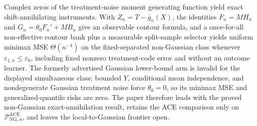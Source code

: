 Complex zeros of the treatment-noise moment generating function yield exact shift-annihilating instruments. With \(Z_n=T-\bar g_n(X)\), the identities \(F_n=M H_n\) and \(G_n=\theta_0F_n'+M B_n\) give an observable contour formula, and a once-for-all non-effective contour bank plus a measurable split-sample selector yields uniform minimax MSE \(\Theta(n^{-1})\) on the fixed-separated non-Gaussian class whenever \(\varepsilon_{1,n}\le\varepsilon_0\), including fixed nonzero treatment-code error and without an outcome learner. The formerly advertised Gaussian lower-bound arm is invalid for the displayed simultaneous class: bounded \(Y\), conditional mean independence, and nondegenerate Gaussian treatment noise force \(\theta_0=0\), so its minimax MSE and generalized-quantile risks are zero. The paper therefore leads with the proved non-Gaussian exact-annihilation result, retains the ACE comparison only on \(\mathcal P_{\mathrm{NG},n}^{\mathrm{ACE}}\), and leaves the local-to-Gaussian frontier open.